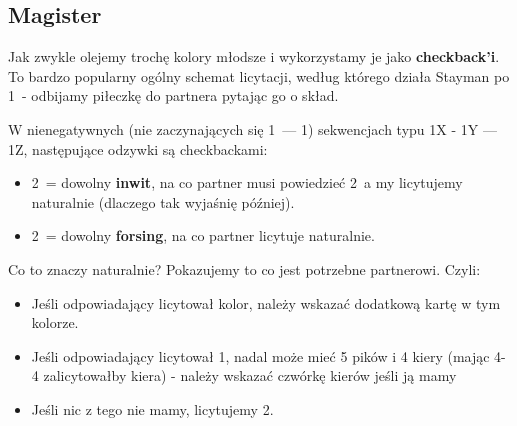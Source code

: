 \documentclass[12pt, a4paper]{article}
\begin{document}
    \subsection{Magister}
    Jak zwykle olejemy trochę kolory młodsze i wykorzystamy je jako 
    \textbf{checkback'i}. To bardzo popularny ogólny schemat licytacji,
    według którego działa Stayman po 1\nt\ - odbijamy piłeczkę do partnera
    pytając go o skład.

    \begin{formal}
        W nienegatywnych (nie zaczynających się 1\clubs\ --- 1\diams) sekwencjach
        typu 1X - 1Y --- 1Z, następujące odzywki są checkbackami:
        \begin{itemize}
            \item 2\clubs\ = dowolny \textbf{inwit}, na co partner musi powiedzieć 2\diams\,
            a my licytujemy naturalnie 
            (dlaczego tak wyjaśnię później).
            \item 2\diams\ = dowolny \textbf{forsing}, na co partner licytuje naturalnie.
        \end{itemize}
    \end{formal}

    Co to znaczy naturalnie? Pokazujemy to co jest potrzebne partnerowi.
    Czyli:
    \begin{itemize}
        \item Jeśli odpowiadający licytował kolor, należy wskazać dodatkową
        kartę w tym kolorze.
        \item Jeśli odpowiadający licytował 1\spades, nadal może mieć 
        5 pików i 4 kiery (mając 4-4 zalicytowałby kiera)
        - należy wskazać czwórkę kierów jeśli ją mamy
        \item Jeśli nic z tego nie mamy, licytujemy 2\nt.
    \end{itemize}
\end{document}
